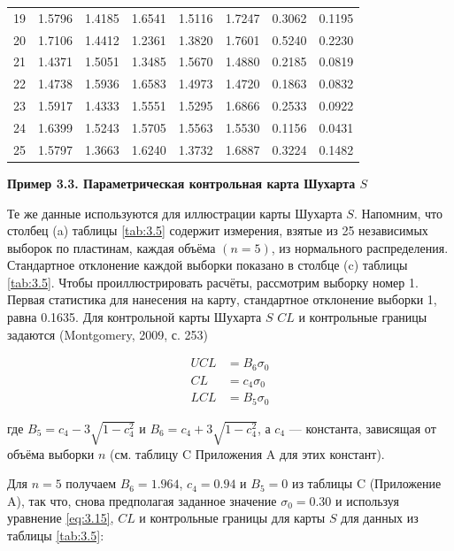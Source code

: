 \begin{table}[htbp]
\begin{tabular}{c *{5}{r} r r}
		19 & 1.5796 & 1.4185 & 1.6541 & 1.5116 & 1.7247 & 0.3062 & 0.1195 \\
		20 & 1.7106 & 1.4412 & 1.2361 & 1.3820 & 1.7601 & 0.5240 & 0.2230 \\
		21 & 1.4371 & 1.5051 & 1.3485 & 1.5670 & 1.4880 & 0.2185 & 0.0819 \\
		22 & 1.4738 & 1.5936 & 1.6583 & 1.4973 & 1.4720 & 0.1863 & 0.0832 \\
		23 & 1.5917 & 1.4333 & 1.5551 & 1.5295 & 1.6866 & 0.2533 & 0.0922 \\
		24 & 1.6399 & 1.5243 & 1.5705 & 1.5563 & 1.5530 & 0.1156 & 0.0431 \\
		25 & 1.5797 & 1.3663 & 1.6240 & 1.3732 & 1.6887 & 0.3224 & 0.1482 \\
		\bottomrule
	\end{tabular}
\end{table}

\noindent\textbf{Пример 3.3. Параметрическая контрольная карта Шухарта \(S\)}

Те же данные используются для иллюстрации карты Шухарта \(S\). Напомним, что столбец (a) таблицы \ref{tab:3.5} содержит измерения, взятые из 25 независимых выборок по пластинам, каждая объёма \((n = 5)\), из нормального распределения. Стандартное отклонение каждой выборки показано в столбце (c) таблицы \ref{tab:3.5}. Чтобы проиллюстрировать расчёты, рассмотрим выборку номер 1. Первая статистика для нанесения на карту, стандартное отклонение выборки 1, равна 0.1635. Для контрольной карты Шухарта \(S\) \(CL\) и контрольные границы задаются (Montgomery, 2009, с. 253)

\begin{equation}
	\begin{aligned}
		UCL &= B_6\sigma_0 \\
		CL &= c_4\sigma_0 \\
		LCL &= B_5\sigma_0
	\end{aligned}
	\label{eq:3.15}
\end{equation}

где \(B_5 = c_4 - 3\sqrt{1 - c_4^2}\) и \(B_6 = c_4 + 3\sqrt{1 - c_4^2}\), а \(c_4\) — константа, зависящая от объёма выборки \(n\) (см. таблицу C Приложения A для этих констант).

Для \(n = 5\) получаем \(B_6 = 1.964\), \(c_4 = 0.94\) и \(B_5 = 0\) из таблицы C (Приложение A), так что, снова предполагая заданное значение \(\sigma_0 = 0.30\) и используя уравнение \eqref{eq:3.15}, \(CL\) и контрольные границы для карты \(S\) для данных из таблицы \ref{tab:3.5}:

